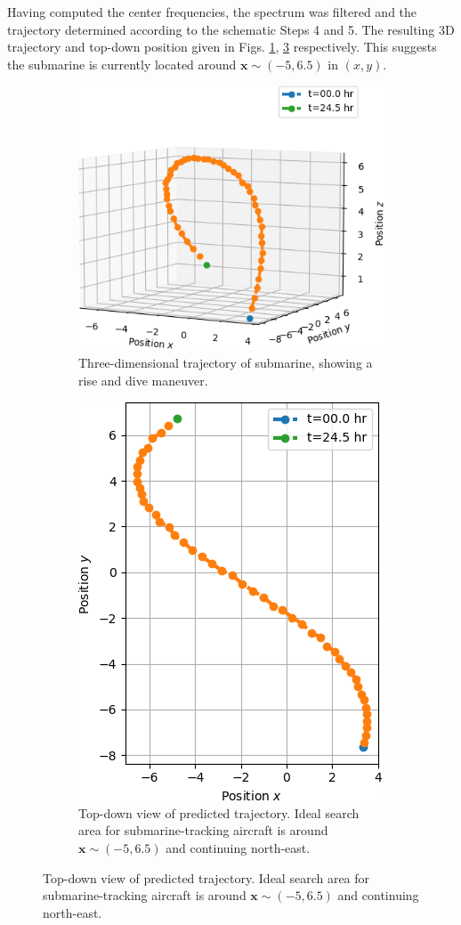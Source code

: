 \documentclass{article}
\begin{document}
Having computed the center frequencies, the spectrum was filtered and the trajectory determined according to the schematic Steps 4 and 5. The resulting 3D trajectory and top-down position given in Figs. \ref{traj:3d}, \ref{traj:2d} respectively. This suggests the submarine is currently located around $\bm{x}\sim(-5, 6.5)$ in $(x,y)$.

\begin{figure}[hb]
  \centering
  \begin{subfigure}{0.42\textwidth}
    \centering
    \includegraphics[width=0.99\linewidth]{pics/3d_traj}
    \caption{Three-dimensional trajectory of submarine, showing a rise and dive maneuver.}\label{traj:3d}
  \end{subfigure}
  \begin{subfigure}{0.42\textwidth}
    \centering
    \includegraphics[width=0.68\linewidth]{pics/2d_traj}
    \caption{Top-down view of predicted trajectory. Ideal search area for submarine-tracking aircraft is around $\bm{x} \sim (-5, 6.5)$ and continuing north-east.}\label{traj:2d}
  \end{subfigure}
\end{figure}
\end{document}

